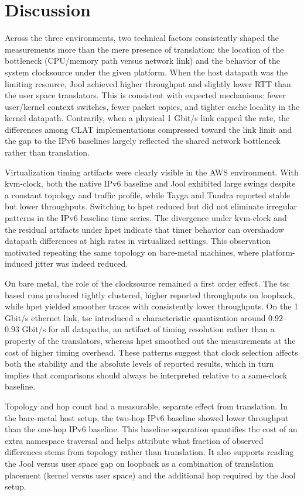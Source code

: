 \section{Discussion}

Across the three environments, two technical factors consistently shaped the measurements more than the mere presence of translation: the location of the bottleneck (CPU/memory path versus network link) and the behavior of the system clocksource under the given platform. When the host datapath was the limiting resource, Jool achieved higher throughput and slightly lower RTT than the user space translators. This is consistent with expected mechanisms: fewer user/kernel context switches, fewer packet copies, and tighter cache locality in the kernel datapath. Contrarily, when a physical 1 Gbit/s link capped the rate, the differences among CLAT implementations compressed toward the link limit and the gap to the IPv6 baselines largely reflected the shared network bottleneck rather than translation.

Virtualization timing artifacts were clearly visible in the AWS environment. With kvm-clock, both the native IPv6 baseline and Jool exhibited large swings despite a constant topology and traffic profile, while Tayga and Tundra reported stable but lower throughputs. Switching to hpet reduced but did not eliminate irregular patterns in the IPv6 baseline time series. The divergence under kvm-clock and the residual artifacts under hpet indicate that timer behavior can overshadow datapath differences at high rates in virtualized settings. This observation motivated repeating the same topology on bare-metal machines, where platform-induced jitter was indeed reduced.

On bare metal, the role of the clocksource remained a first order effect. The tsc based runs produced tightly clustered, higher reported throughputs on loopback, while hpet yielded smoother traces with consistently lower throughputs. On the 1 Gbit/s ethernet link, tsc introduced a characteristic quantization around 0.92–0.93 Gbit/s for all datapaths, an artifact of timing resolution rather than a property of the translators, whereas hpet smoothed out the measurements at the cost of higher timing overhead. These patterns suggest that clock selection affects both the stability and the absolute levels of reported results, which in turn implies that comparisons should always be interpreted relative to a same-clock baseline.

Topology and hop count had a measurable, separate effect from translation. In the bare-metal host setup, the two-hop IPv6 baseline showed lower throughput than the one-hop IPv6 baseline. This baseline separation quantifies the cost of an extra namespace traversal and helps attribute what fraction of observed differences stems from topology rather than translation. It also supports reading the Jool versus user space gap on loopback as a combination of translation placement (kernel versus user space) and the additional hop required by the Jool setup.

